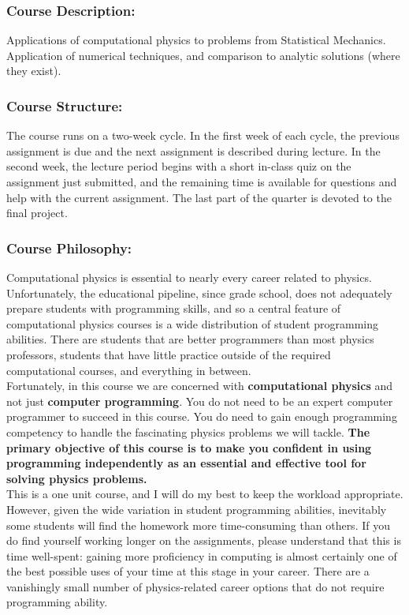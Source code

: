 \documentclass[12pt]{article}
\begin{document}
\subsubsection*{Course Description:}

Applications of computational physics to problems from Statistical
Mechanics.  Application of numerical techniques, and comparison to
analytic solutions (where they exist).

\subsubsection*{Course Structure:}

The course runs on a two-week cycle.  In the first week of each cycle,
the previous assignment is due and the next assignment is described
during lecture.  In the second week, the lecture period begins with a
short in-class quiz on the assignment just submitted, and the
remaining time is available for questions and help with the current
assignment.  The last part of the quarter is devoted to the final
project.

\subsubsection*{Course Philosophy:}

Computational physics is essential to nearly every career related to
physics.  Unfortunately, the educational pipeline, since grade school,
does not adequately prepare students with programming skills, and so a
central feature of computational physics courses is a wide
distribution of student programming abilities.  There are students
that are better programmers than most physics professors, students
that have little practice outside of the required computational
courses, and everything in between.\\[3pt]

\noindent
Fortunately, in this course we are concerned with {\bf computational
  physics} and not just {\bf computer programming}.  You do not need
to be an expert computer programmer to succeed in this course. You do
need to gain enough programming competency to handle the fascinating
physics problems we will tackle.  {\bf The primary objective of this
  course is to make you confident in using programming independently
  as an essential and effective tool for solving physics
  problems.}\\[3pt]

\noindent
This is a one unit course, and I will do my best to keep the workload
appropriate.  However, given the wide variation in student programming
abilities, inevitably some students will find the homework more
time-consuming than others.  If you do find yourself working longer on
the assignments, please understand that this is time well-spent:
gaining more proficiency in computing is almost certainly one of the
best possible uses of your time at this stage in your career.  There
are a vanishingly small number of physics-related career options that
do not require programming ability.
\end{document}

